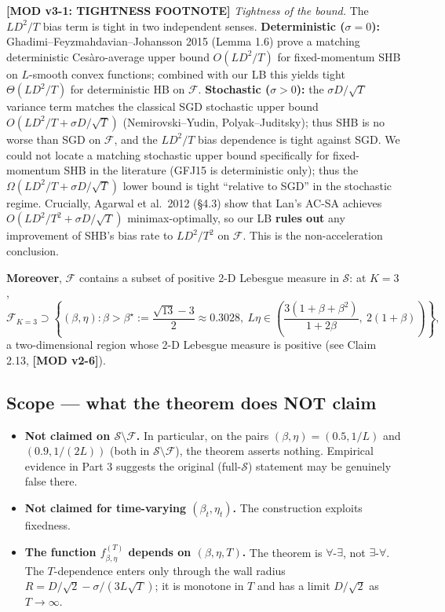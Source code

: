 \documentclass[11pt,a4paper]{article}
\theoremstyle{plain}
\theoremstyle{definition}
\theoremstyle{remark}
\newcommand{\F}{\mathcal{F}}
\newcommand{\Sset}{\mathcal{S}}
\begin{document}
\textbf{[MOD v3-1: TIGHTNESS FOOTNOTE]} \emph{Tightness of the bound.} The $LD^2/T$ bias term is tight in two independent senses. \textbf{Deterministic ($\sigma=0$):} Ghadimi--Feyzmahdavian--Johansson 2015 (Lemma 1.6) prove a matching deterministic Ces\`aro-average upper bound $O(LD^2/T)$ for fixed-momentum SHB on $L$-smooth convex functions; combined with our LB this yields tight $\Theta(LD^2/T)$ for deterministic HB on $\F$. \textbf{Stochastic ($\sigma>0$):} the $\sigma D/\sqrt T$ variance term matches the classical SGD stochastic upper bound $O(LD^2/T + \sigma D/\sqrt T)$ (Nemirovski--Yudin, Polyak--Juditsky); thus SHB is no worse than SGD on $\F$, and the $LD^2/T$ bias dependence is tight against SGD. We could not locate a matching stochastic upper bound specifically for fixed-momentum SHB in the literature (GFJ15 is deterministic only); thus the $\Omega(LD^2/T + \sigma D/\sqrt T)$ lower bound is tight ``relative to SGD'' in the stochastic regime. Crucially, Agarwal et al.\ 2012 (\S4.3) show that Lan's AC-SA achieves $O(LD^2/T^2 + \sigma D/\sqrt T)$ minimax-optimally, so our LB \textbf{rules out} any improvement of SHB's bias rate to $LD^2/T^2$ on $\F$. This is the non-acceleration conclusion.

\textbf{Moreover}, $\F$ contains a subset of positive 2-D Lebesgue measure in $\Sset$: at $K = 3$,
\[
\F_{K=3} \supset \left\{(\beta,\eta) : \beta > \beta^\star := \frac{\sqrt{13} - 3}{2} \approx 0.3028,\ L\eta \in \left(\frac{3(1 + \beta + \beta^2)}{1 + 2\beta},\ 2(1+\beta)\right)\right\},
\]
a two-dimensional region whose 2-D Lebesgue measure is positive (see Claim 2.13, \textbf{[MOD v2-6]}).

\subsection{Scope --- what the theorem does NOT claim}

\begin{itemize}
\item \textbf{Not claimed on $\Sset\setminus\F$.} In particular, on the pairs $(\beta, \eta) = (0.5, 1/L)$ and $(0.9, 1/(2L))$ (both in $\Sset\setminus\F$), the theorem asserts nothing. Empirical evidence in Part 3 suggests the original (full-$\Sset$) statement may be genuinely false there.
\item \textbf{Not claimed for time-varying $(\beta_t, \eta_t)$.} The construction exploits fixedness.
\item \textbf{The function $f_{\beta,\eta}^{(T)}$ depends on $(\beta, \eta, T)$.} The theorem is $\forall$-$\exists$, not $\exists$-$\forall$. The $T$-dependence enters only through the wall radius $R = D/\sqrt 2 - \sigma/(3L\sqrt T)$; it is monotone in $T$ and has a limit $D/\sqrt 2$ as $T \to \infty$.
\end{itemize}
\end{document}
